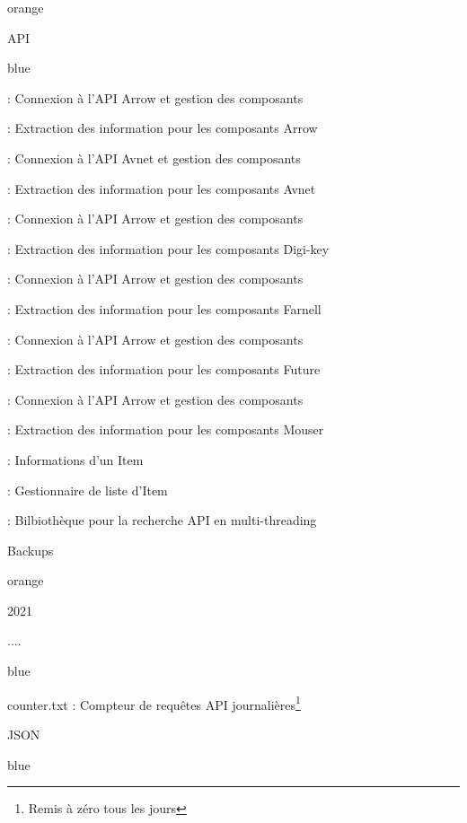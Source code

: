 {\begin{items}{orange}{\Triangle}
\item API
\begin{items}{blue}{\Triangle}
\item {} : Connexion à l'API Arrow et gestion des composants
\item {} : Extraction des information pour les composants Arrow
\item {} : Connexion à l'API Avnet et gestion des composants
\item {} : Extraction des information pour les composants Avnet
\item {} : Connexion à l'API Arrow et gestion des composants
\item {} : Extraction des information pour les composants Digi-key
\item {} : Connexion à l'API Arrow et gestion des composants
\item {} : Extraction des information pour les composants Farnell
\item {} : Connexion à l'API Arrow et gestion des composants
\item {} : Extraction des information pour les composants Future
\item {} : Connexion à l'API Arrow et gestion des composants
\item {} : Extraction des information pour les composants Mouser
\item {} : Informations d'un Item
\item {} : Gestionnaire de liste d'Item
\item {} : Bilbiothèque pour la recherche API en multi-threading
\end{items}
\item Backups
\begin{items}{orange}{\Triangle}
\item 2021
\item ....
\end{items}
\begin{items}{blue}{\Triangle}
\item counter.txt : Compteur de requêtes API  journalières\footnote{Remis à zéro tous les jours}
\end{items}
\item JSON
\begin{items}{blue}{\Triangle}

\end{items}
\end{items}}
